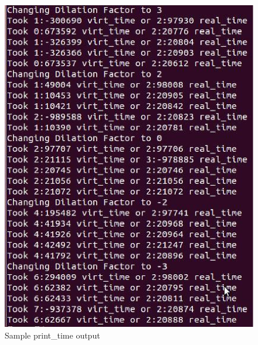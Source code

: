 \begin{figure}[t]
      \includegraphics[width=\textwidth]{images/printtime.eps}
    \caption{Sample print\_time output }
    \label{fig:printtime}
  \end{figure}

